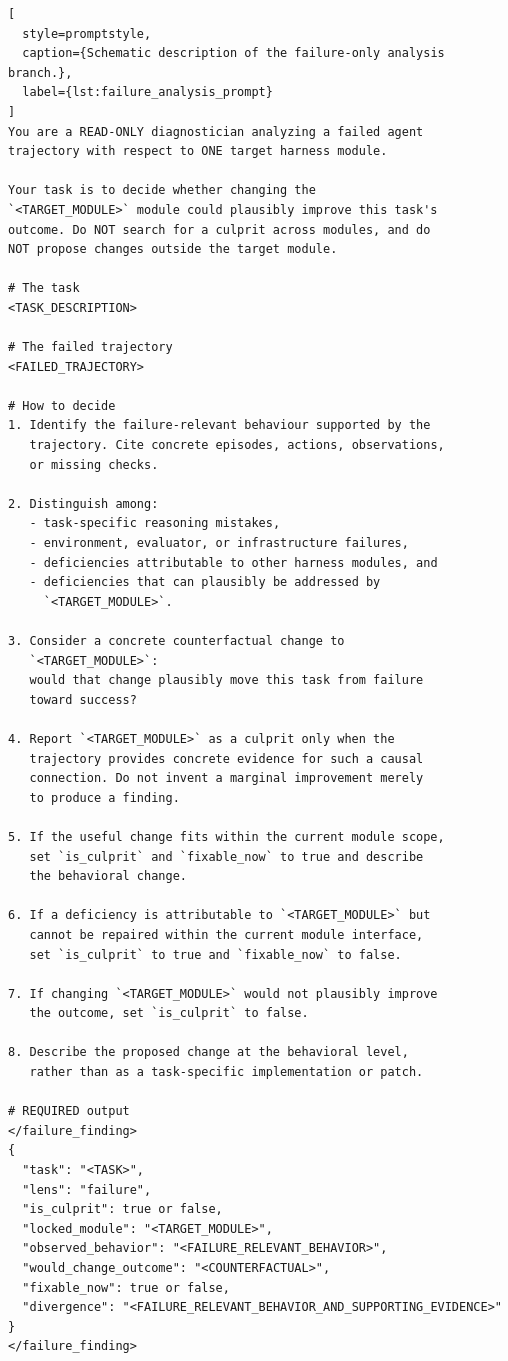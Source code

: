\documentclass{article} %
\begin{document}
\begin{lstlisting}[
  style=promptstyle,
  caption={Schematic description of the failure-only analysis branch.},
  label={lst:failure_analysis_prompt}
]
You are a READ-ONLY diagnostician analyzing a failed agent
trajectory with respect to ONE target harness module.

Your task is to decide whether changing the
`<TARGET_MODULE>` module could plausibly improve this task's
outcome. Do NOT search for a culprit across modules, and do
NOT propose changes outside the target module.

# The task
<TASK_DESCRIPTION>

# The failed trajectory
<FAILED_TRAJECTORY>

# How to decide
1. Identify the failure-relevant behaviour supported by the
   trajectory. Cite concrete episodes, actions, observations,
   or missing checks.

2. Distinguish among:
   - task-specific reasoning mistakes,
   - environment, evaluator, or infrastructure failures,
   - deficiencies attributable to other harness modules, and
   - deficiencies that can plausibly be addressed by
     `<TARGET_MODULE>`.

3. Consider a concrete counterfactual change to
   `<TARGET_MODULE>`:
   would that change plausibly move this task from failure
   toward success?

4. Report `<TARGET_MODULE>` as a culprit only when the
   trajectory provides concrete evidence for such a causal
   connection. Do not invent a marginal improvement merely
   to produce a finding.

5. If the useful change fits within the current module scope,
   set `is_culprit` and `fixable_now` to true and describe
   the behavioral change.

6. If a deficiency is attributable to `<TARGET_MODULE>` but
   cannot be repaired within the current module interface,
   set `is_culprit` to true and `fixable_now` to false.

7. If changing `<TARGET_MODULE>` would not plausibly improve
   the outcome, set `is_culprit` to false.

8. Describe the proposed change at the behavioral level,
   rather than as a task-specific implementation or patch.

# REQUIRED output
</failure_finding>
{
  "task": "<TASK>",
  "lens": "failure",
  "is_culprit": true or false,
  "locked_module": "<TARGET_MODULE>",
  "observed_behavior": "<FAILURE_RELEVANT_BEHAVIOR>",
  "would_change_outcome": "<COUNTERFACTUAL>",
  "fixable_now": true or false,
  "divergence": "<FAILURE_RELEVANT_BEHAVIOR_AND_SUPPORTING_EVIDENCE>"
}
</failure_finding>
\end{lstlisting}
\end{document}
